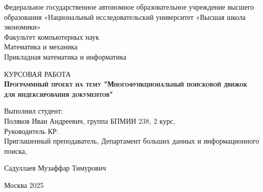 \begin{titlepage}
    \newpage
    
    {
    \begin{center}
    Федеральное государственное автономное образовательное учреждение высшего образования «Национальный исследовательский университет «Высшая школа экономики»
    \\
    \bigskip
    Факультет компьютерных наук \\
    Математика и механика\\
    Прикладная математика и информатика \\
    \end{center}
    }
    
    \vspace{8em}
    
    \begin{center}
    {\Large КУРСОВАЯ РАБОТА}\\
    \textsc{\textbf{
    Программный проект на тему
    \linebreak
    "Многофункциональный поисковой движок для индексирования документов"}}
    \end{center}
    
    \vspace{2em}
    
    {
    \hfill\parbox{16cm}{
    \hspace*{5cm}\hspace*{-5cm} 
    Выполнил студент:\\
    Поляков Иван Андреевич, группа БПМИИ 238, 2 курс,\\
     
    \hspace*{5cm}\hspace*{-5cm}
    Руководитель КР:\\
    Приглашенный преподаватель, Департамент больших данных и информационного поиска, 
    
    Садуллаев Музаффар Тимурович}}
    
    \vspace{\fill}
    
    \begin{center}
    Москва 2025
    \end{center}
    
    \end{titlepage}